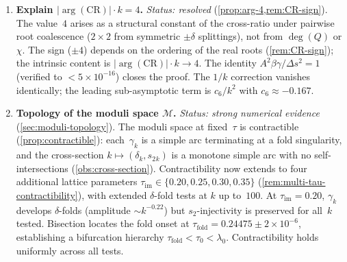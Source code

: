 \documentclass[11pt,a4paper]{article}
\theoremstyle{plain}
\theoremstyle{definition}
\theoremstyle{remark}
\DeclareMathOperator{\Real}{Re}
\newcommand{\ii}{\mathrm{i}}
\newcommand{\Oo}{\mathcal{O}}
\begin{document}
\begin{enumerate}[label=\textbf{OP\arabic*.},nosep]
  \emph{Status: partially resolved} (\cref{conj:tau-spec}).
  The spectral modular parameter
  $\tau_{\mathrm{spec}} = -\tfrac12 + \ii\ln(4k)/\pi
  - \ii/(8\pi k^2) + \Oo(k^{-4})$
  provides the sought bridge: $k$ is encoded in the conformal
  type of the spectral curve via~\eqref{eq:tau-spec}, and the
  elliptic lambda function closes the circle
  ($\lambda(\tau_{\mathrm{spec}}) = \mathrm{CR}_k$).
  The real part $\Real\,\tau_{\mathrm{spec}} = -1/2$ is
  universal across all~$\tau_{\mathrm{BHS}}$
  (\cref{prop:tau-univ}).
  The factorization $A^2 = F_{\mathrm{loc}} \times
  F_{\mathrm{glob}}$ (\cref{eq:A2-formula}) mirrors
  Gavrylenko--Lisovyy $\tau$-function
  expansions~\cite{GL18,GIL12}.
  What remains open is the \emph{connection constant}~$C_0$
  in~\eqref{eq:jimbo-log}: it is conjectured
  (\cref{conj:C0}) but not numerically extractable due to
  the logarithmic degeneracy of the unipotent PVI
  asymptotics.

\item \textbf{Explain $\lvert\arg(\mathrm{CR})\rvert \cdot k = 4$.}
  \emph{Status: resolved} (\cref{prop:arg-4,rem:CR-sign}).
  The value~$4$ arises as a structural constant of the
  cross-ratio under pairwise root coalescence
  ($2 \times 2$ from symmetric $\pm\delta$ splittings),
  not from $\deg(Q)$ or $\chi$.
  The sign ($\pm 4$) depends on the ordering of the
  real roots (\cref{rem:CR-sign}); the intrinsic content
  is $\lvert\arg(\mathrm{CR})\rvert \cdot k \to 4$.
  The identity $A^2\beta\gamma/\Delta s^2 = 1$
  (verified to $< 5 \times 10^{-16}$)
  closes the proof.
  The $1/k$ correction vanishes identically;
  the leading sub-asymptotic term is
  $c_6/k^2$ with $c_6 \approx -0.167$.

\item \textbf{Topology of the moduli space $\mathcal{M}$.}
  \emph{Status: strong numerical evidence} (\cref{sec:moduli-topology}).
  The moduli space at fixed~$\tau$ is contractible
  (\cref{prop:contractible}): each~$\gamma_k$ is a simple arc
  terminating at a fold singularity, and the cross-section
  $k \mapsto (\delta_k, s_2{}_k)$ is a monotone simple arc
  with no self-intersections (\cref{obs:cross-section}).
  Contractibility now extends to four additional lattice
  parameters $\tau_{\mathrm{im}} \in \{0.20, 0.25, 0.30, 0.35\}$
  (\cref{rem:multi-tau-contractibility}), with extended
  $\delta$-fold tests at $k$ up to~$100$.
  At $\tau_{\mathrm{im}} = 0.20$, $\gamma_k$ develops
  $\delta$-folds (amplitude $\sim k^{-0.22}$) but
  $s_2$-injectivity is preserved for all~$k$ tested.
  Bisection locates the fold onset at
  $\tau_{\mathrm{fold}} = 0.24475 \pm 2 \times 10^{-6}$,
  establishing a bifurcation hierarchy
  $\tau_{\mathrm{fold}} < \tau_0 < \lambda_0$.
  Contractibility holds uniformly across all tests.


\end{enumerate}
\end{document}
